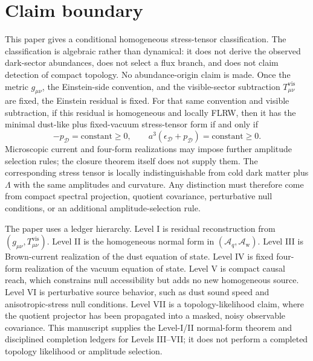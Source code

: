 \documentclass[
  aps,
  prd,
  reprint,
  superscriptaddress,
  floatfix,
  nofootinbib,
  longbibliography
]{revtex4-2}
\theoremstyle{plain}
\theoremstyle{definition}
\theoremstyle{remark}
\newcommand{\D}{\mathcal D}
\newcommand{\vis}{\mathrm{vis}}
\newcommand{\Aq}{\mathcal A_q}
\newcommand{\Aw}{\mathcal A_{\mathrm w}}
\newcommand{\eps}{\epsilon}
\begin{document}
\maketitle

\section{Claim boundary}

This paper gives a conditional homogeneous stress-tensor classification.  The
classification is algebraic rather than dynamical: it does not derive the
observed dark-sector abundances, does not select a flux branch, and does not
claim detection of compact topology.  No abundance-origin claim is made.  Once
the metric \(g_{\mu\nu}\), the Einstein-side convention, and the visible-sector
subtraction \(T^{\vis}_{\mu\nu}\) are fixed, the Einstein residual is fixed.  For
that same convention and visible subtraction, if this residual is homogeneous
and locally FLRW, then it has the minimal dust-like plus fixed-vacuum
stress-tensor form if and only if
\begin{equation}
-p_\D=\text{constant}\ge0,
\qquad
a^3(\eps_\D+p_\D)=\text{constant}\ge0 .
\label{eq:claim_boundary_closure}
\end{equation}
Microscopic current and four-form realizations may impose further amplitude
selection rules; the closure theorem itself does not supply them.  The
corresponding stress tensor is locally indistinguishable from cold dark matter
plus \(\Lambda\) with the same amplitudes and curvature.  Any distinction must
therefore come from compact spectral projection, quotient covariance,
perturbative null conditions, or an additional amplitude-selection rule.

The paper uses a ledger hierarchy.  Level I is residual reconstruction from
\((g_{\mu\nu},T^{\vis}_{\mu\nu})\).  Level II is the homogeneous normal form in
\((\Aq,\Aw)\).  Level III is Brown-current realization of the dust equation of
state.  Level IV is fixed four-form realization of the vacuum equation of
state.  Level V is compact causal reach, which constrains null accessibility but
adds no new homogeneous source.  Level VI is perturbative source behavior, such
as dust sound speed and anisotropic-stress null conditions.  Level VII is a
topology-likelihood claim, where the quotient projector has been propagated into
a masked, noisy observable covariance.  This manuscript supplies the Level-I/II
normal-form theorem and disciplined completion ledgers for Levels III--VII; it
does not perform a completed topology likelihood or amplitude selection.
\end{document}
